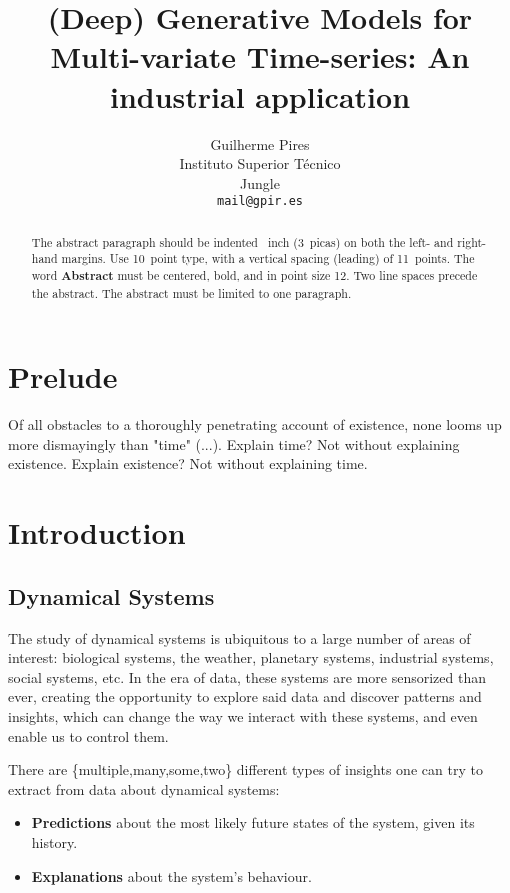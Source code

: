 \documentclass{article}
\title{(Deep) Generative Models for Multi-variate Time-series: 
An industrial application}
\author{%
  Guilherme Pires \\
  Instituto Superior Técnico \\
  Jungle \\
  \texttt{mail@gpir.es} \\
}
\begin{document}
\maketitle

\begin{abstract}
  The abstract paragraph should be indented ~inch (3~picas) on
  both the left- and right-hand margins. Use 10~point type, with a vertical
  spacing (leading) of 11~points.  The word \textbf{Abstract} must be centered,
  bold, and in point size 12. Two line spaces precede the abstract. The abstract
  must be limited to one paragraph.
\end{abstract}

\section{Prelude}
\begin{displayquote}
Of all obstacles to a thoroughly penetrating account of existence, none looms
up more dismayingly than "time" (...). Explain time? Not without explaining 
existence. Explain existence? Not without explaining time.
\end{displayquote}

\section{Introduction}

\subsection{Dynamical Systems}
The study of dynamical systems is ubiquitous to a large number of areas of
interest: biological systems, the weather, planetary systems, industrial
systems, social systems, etc. In the era of data, these systems are more
sensorized than ever, creating the opportunity to explore said data and
discover patterns and insights, which can change the way we interact with
these systems, and even enable us to control them.

There are \{multiple,many,some,two\} different types of insights one can try to
extract from data about dynamical systems:
\begin{itemize}
    \item \textbf{Predictions} about the most likely future states of the system,
        given its history.
    \item \textbf{Explanations} about the system's behaviour.
\end{itemize}
\end{document}
